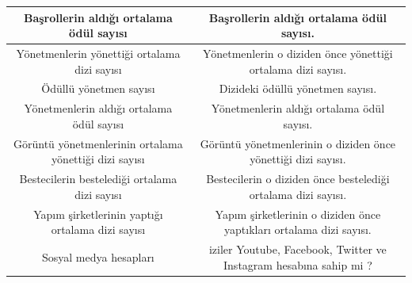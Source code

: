 \begin{table}[h]
{{{\begin{tabular}{|c|c|}
Başrollerin aldığı ortalama ödül sayısı                & Başrollerin aldığı ortalama ödül sayısı.                                                                                \\ \hline
Yönetmenlerin yönettiği ortalama dizi sayısı           & Yönetmenlerin o diziden önce yönettiği ortalama dizi sayısı.                                                            \\ \hline
Ödüllü yönetmen sayısı                                 & Dizideki ödüllü yönetmen sayısı.                                                                                        \\ \hline
Yönetmenlerin aldığı ortalama ödül sayısı              & Yönetmenlerin aldığı ortalama ödül sayısı.                                                                              \\ \hline
Görüntü yönetmenlerinin ortalama yönettiği dizi sayısı & Görüntü yönetmenlerinin o diziden önce yönettiği dizi sayısı.                                                           \\ \hline
Bestecilerin bestelediği ortalama dizi sayısı          & Bestecilerin o diziden önce bestelediği ortalama dizi sayısı.                                                           \\ \hline
Yapım şirketlerinin yaptığı ortalama dizi sayısı       & Yapım şirketlerinin o diziden önce yaptıkları ortalama dizi sayısı.                                                     \\ \hline
Sosyal medya hesapları                                 & iziler Youtube, Facebook, Twitter ve Instagram hesabına sahip mi ?                                                      \\ \hline
\end{tabular}%
}}}
\end{table}